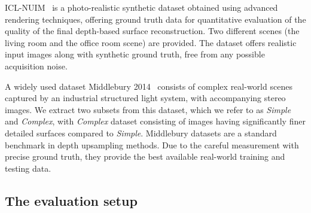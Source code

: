 ICL-NUIM~\cite{handa:etal:ICRA2014} is a photo-realistic synthetic dataset obtained using
advanced rendering techniques, offering ground truth data for quantitative evaluation
of the quality of the final depth-based surface reconstruction. 
Two different scenes (the living room  and the office room scene) are provided.
The dataset offers realistic input images along with synthetic ground truth, 
free from any possible acquisition noise.



A widely used dataset Middlebury 2014~\cite{scharstein2014high} consists of complex real-world scenes
captured by an industrial structured light system, with accompanying stereo images.
We extract two subsets from this dataset, which we refer to as \emph{Simple} and \emph{Complex},
with \emph{Complex} dataset consisting of images having significantly finer detailed
surfaces compared to \emph{Simple}. Middlebury datasets are a standard benchmark in depth upsampling methods.
Due to the careful measurement with precise ground truth, they provide the 
best available real-world training and testing data.




\subsection{The evaluation setup}


